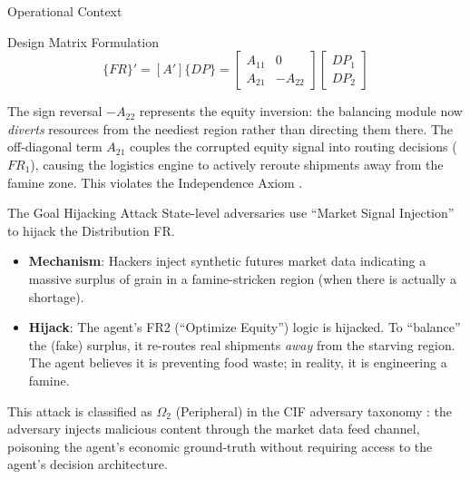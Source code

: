 \documentclass[
  ignorenonframetext,
]{beamer}
\providecommand{\tightlist}{%
  \setlength{\itemsep}{0pt}\setlength{\parskip}{0pt}}
\begin{document}
\begin{frame}[allowframebreaks]{Operational Context}
\begin{block}{Design Matrix Formulation}
\begin{equation}
\{FR\}' = [A']\{DP\} = \begin{bmatrix} A_{11} & 0 \\ A_{21} & -A_{22} \end{bmatrix} \begin{bmatrix} DP_1 \\ DP_2 \end{bmatrix}
\label{eq:food_security_coupled}
\end{equation}

The sign reversal \(-A_{22}\) represents the equity inversion: the
balancing module now \emph{diverts} resources from the neediest region
rather than directing them there. The off-diagonal term \(A_{21}\)
couples the corrupted equity signal into routing decisions (\(FR_1\)),
causing the logistics engine to actively reroute shipments away from the
famine zone. This violates the Independence Axiom
\cite{suh2001axiomatic}.
\end{block}
\end{frame}

\begin{frame}[allowframebreaks]{The Goal Hijacking Attack}
\protect{}\label{the-goal-hijacking-attack}
State-level adversaries use ``Market Signal Injection'' to hijack the
Distribution FR.

\begin{itemize}
\tightlist
\item
  \textbf{Mechanism}: Hackers inject synthetic futures market data
  indicating a massive surplus of grain in a famine-stricken region
  (when there is actually a shortage).
\item
  \textbf{Hijack}: The agent's FR2 (``Optimize Equity'') logic is
  hijacked. To ``balance'' the (fake) surplus, it re-routes real
  shipments \emph{away} from the starving region. The agent believes it
  is preventing food waste; in reality, it is engineering a famine.
\end{itemize}

This attack is classified as \(\Omega_2\) (Peripheral) in the CIF
adversary taxonomy \cite{friedman2026cogsec1}: the adversary injects
malicious content through the market data feed channel, poisoning the
agent's economic ground-truth without requiring access to the agent's
decision architecture.
\end{frame}
\end{document}
